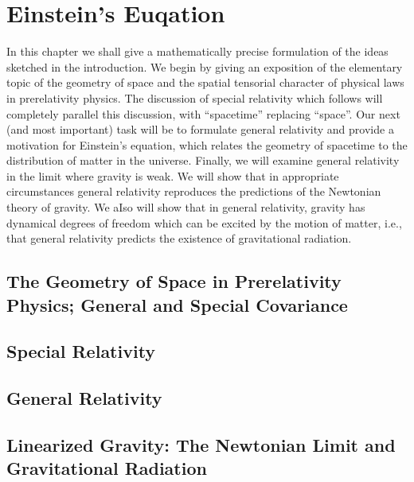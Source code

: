 \chapter{Einstein's Euqation}
In this chapter we shall give a mathematically precise formulation of the ideas sketched in the introduction. We begin by giving an exposition of the elementary topic of the geometry of space and the spatial tensorial character of physical laws in prerelativity physics. The discussion of special relativity which follows will completely parallel this discussion, with ``spacetime'' replacing ``space''. Our next (and most important) task will be to formulate general relativity and provide a motivation for Einstein's equation, which relates the geometry of spacetime to the distribution of matter in the universe. Finally, we will examine general relativity in the limit where gravity is weak. We will show that in appropriate circumstances general relativity reproduces the predictions of the Newtonian theory of gravity. We aIso will show that in general relativity, gravity has dynamical degrees of freedom which can be excited by the motion of matter, i.e., that general relativity predicts the existence of gravitational radiation.

\section{The Geometry of Space in Prerelativity Physics; General and Special Covariance}
\section{Special Relativity}
\label{4.2.2}

\section{General Relativity}
\section{Linearized Gravity: The Newtonian Limit and Gravitational Radiation}

% 